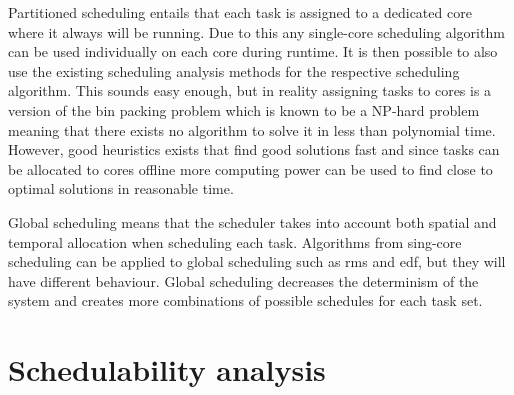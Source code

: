 \documentclass{kththesis}
\begin{document}
Partitioned scheduling entails that each task is assigned to a dedicated core where it always will
be running. Due to this any single-core scheduling algorithm can be used individually on each core
during runtime. It is then possible to also use the existing scheduling analysis methods for the
respective scheduling algorithm.  This sounds easy enough, but in reality assigning tasks to cores
is a version of the bin packing problem which is known to be a NP-hard problem meaning that there
exists no algorithm to solve it in less than polynomial time. However, good heuristics
\parencite{johnson_fast_1974}\parencite{coffman_application_1978} exists that find good solutions
fast and since tasks can be allocated to cores offline more computing power can be used to find
close to optimal solutions in reasonable time.

Global scheduling means that the scheduler takes into account both spatial and temporal allocation
when scheduling each task. Algorithms from sing-core scheduling can be applied to global scheduling
such as \acrshort{rms} and \acrshort{edf}, but they will have different behaviour. Global scheduling
decreases the determinism of the system and creates more combinations of possible schedules for each
task set.

\section{Schedulability analysis} \label{sec:schedulability_analysis}
\end{document}
